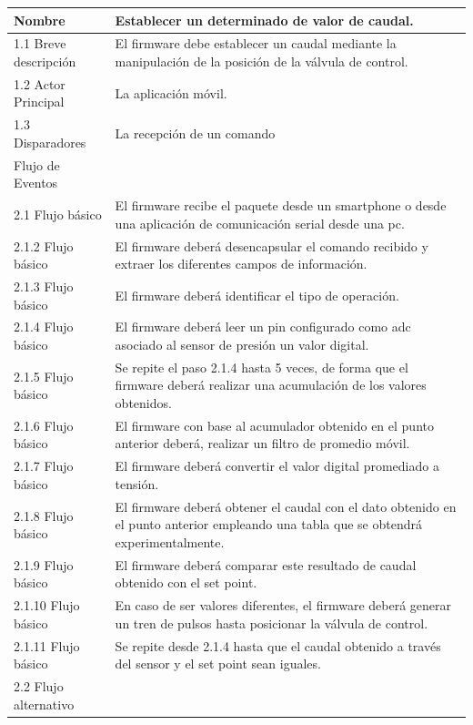 \begin{table}[t]
\begin{center}
\begin{tabular}{ | m{4cm} | m{9cm} | }
\hline 
Nombre & Establecer un determinado de valor de caudal.\\ \hline
1.1 Breve descripción &
El firmware debe establecer un caudal mediante la manipulación de la posición de la válvula de control.\\ \hline
 1.2 Actor Principal & La aplicación móvil.\\ \hline
 1.3 Disparadores & La recepción de un comando \\ \hline
Flujo de Eventos & \\ \hline


 2.1 Flujo básico &
El firmware recibe el paquete desde un smartphone  o desde una aplicación de comunicación serial desde una pc. \\ \hline
 2.1.2 Flujo básico &
El firmware deberá desencapsular el comando recibido y extraer los diferentes campos de información. \\ \hline
 2.1.3 Flujo básico &
El firmware deberá identificar el tipo de operación. \\ \hline


 2.1.4 Flujo básico &
El firmware deberá leer un pin configurado como adc asociado al sensor de presión un valor digital. \\ \hline


2.1.5 Flujo básico &
Se repite el paso 2.1.4 hasta 5 veces, de forma que el firmware deberá realizar una acumulación de los valores obtenidos.\\ \hline
2.1.6 Flujo básico &
 El firmware con base al acumulador obtenido en el punto anterior deberá, realizar un filtro de promedio móvil.  \\ \hline
2.1.7 Flujo básico & 
El firmware deberá convertir el valor digital promediado a tensión.  \\ \hline
2.1.8 Flujo básico & 
El firmware deberá obtener el caudal con el dato obtenido en el punto anterior empleando una tabla que se obtendrá experimentalmente. \\ \hline
2.1.9 Flujo básico &
El firmware deberá comparar este resultado de caudal obtenido con el set point. \\ \hline
2.1.10 Flujo básico &
En caso de ser valores diferentes, el firmware deberá generar un tren de pulsos hasta posicionar la válvula de control. \\ \hline
2.1.11 Flujo básico &
Se repite desde 2.1.4 hasta que el caudal obtenido a través del sensor y el set point sean iguales. \\ \hline
2.2 Flujo alternativo & \\ \hline



\end{tabular}
\end{center}
\end{table}
